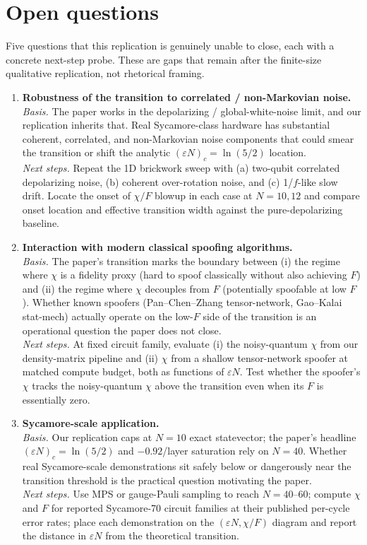 \section{Open questions}

Five questions that this replication is genuinely unable to close, each with a concrete
next-step probe. These are gaps that remain after the finite-size qualitative replication,
not rhetorical framing.

\begin{enumerate}

\item \textbf{Robustness of the transition to correlated / non-Markovian noise.}\\
\emph{Basis.} The paper works in the depolarizing / global-white-noise limit, and our
replication inherits that. Real Sycamore-class hardware has substantial coherent, correlated,
and non-Markovian noise components that could smear the transition or shift the analytic
$(\varepsilon N)_c = \ln(5/2)$ location.\\
\emph{Next steps.} Repeat the 1D brickwork sweep with (a) two-qubit correlated depolarizing
noise, (b) coherent over-rotation noise, and (c) 1/$f$-like slow drift. Locate the onset of
$\chi/F$ blowup in each case at $N=10,12$ and compare onset location and effective transition
width against the pure-depolarizing baseline.

\item \textbf{Interaction with modern classical spoofing algorithms.}\\
\emph{Basis.} The paper's transition marks the boundary between (i) the regime where $\chi$
is a fidelity proxy (hard to spoof classically without also achieving $F$) and (ii) the regime
where $\chi$ decouples from $F$ (potentially spoofable at low $F$). Whether known spoofers
(Pan--Chen--Zhang tensor-network, Gao--Kalai stat-mech) actually operate on the low-$F$ side
of the transition is an operational question the paper does not close.\\
\emph{Next steps.} At fixed circuit family, evaluate (i) the noisy-quantum $\chi$ from our
density-matrix pipeline and (ii) $\chi$ from a shallow tensor-network spoofer at matched
compute budget, both as functions of $\varepsilon N$. Test whether the spoofer's $\chi$ tracks
the noisy-quantum $\chi$ above the transition even when its $F$ is essentially zero.

\item \textbf{Sycamore-scale application.}\\
\emph{Basis.} Our replication caps at $N=10$ exact statevector; the paper's headline
$(\varepsilon N)_c = \ln(5/2)$ and $-0.92$/layer saturation rely on $N=40$. Whether real
Sycamore-scale demonstrations sit safely below or dangerously near the transition threshold
is the practical question motivating the paper.\\
\emph{Next steps.} Use MPS or gauge-Pauli sampling to reach $N=40$--$60$; compute $\chi$ and
$F$ for reported Sycamore-70 circuit families at their published per-cycle error rates; place
each demonstration on the $(\varepsilon N,\chi/F)$ diagram and report the distance in
$\varepsilon N$ from the theoretical transition.


\end{enumerate}
